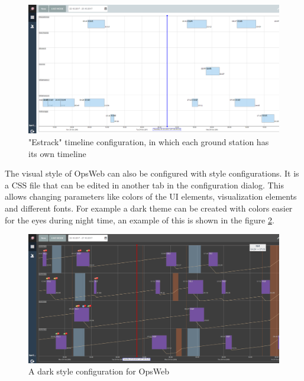 \begin{figure}[ht]
  \begin{center}
    \includegraphics*[width=1\textwidth]{new_cw_estrack}
  \end{center}
  \caption{"Estrack" timeline configuration, in which each ground station has its own timeline}
  \label{fig:new_cw_estrack}
\end{figure}

The visual style of OpsWeb can also be configured with style configurations. It is a CSS file that can be edited in another tab in the configuration dialog. This allows changing parameters like colors of the UI elements, visualization elements and different fonts. For example a dark theme can be created with colors easier for the eyes during night time, an example of this is shown in the figure \ref{fig:new_cw_dark}.

\begin{figure}[ht]
  \begin{center}
    \includegraphics*[width=1\textwidth]{new_cw_dark}
  \end{center}
  \caption{A dark style configuration for OpsWeb}
  \label{fig:new_cw_dark}
\end{figure}


